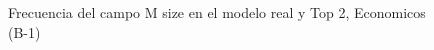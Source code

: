 \begin{figure}[H]
    \centering
    
    \caption{Frecuencia del campo M size en el modelo real y Top 2, Economicos (B-1)}
    \label{frecuency-M Size-top2}
\end{figure}